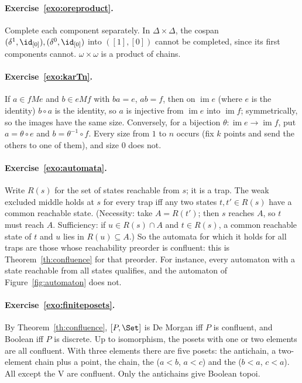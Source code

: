 \paragraph{Exercise~\ref{exo:oreproduct}.} Complete each component separately. In $\Delta\times\Delta$, the cospan $(\delta^1,\id_{[0]}), (\delta^0,\id_{[0]})$ into $([1],[0])$ cannot be completed, since its first components cannot. $\omega\times\omega$ is a product of chains.

\paragraph{Exercise~\ref{exo:karTn}.} If $a\in fMe$ and $b\in eMf$ with $ba = e$, $ab = f$, then on $\operatorname{im}e$ (where $e$ is the identity) $b\circ a$ is the identity, so $a$ is injective from $\operatorname{im}e$ into $\operatorname{im}f$; symmetrically, so the images have the same size. Conversely, for a bijection $\theta : \operatorname{im}e\to\operatorname{im}f$, put $a = \theta\circ e$ and $b = \theta^{-1}\circ f$. Every size from $1$ to $n$ occurs (fix $k$ points and send the others to one of them), and size $0$ does not.

\paragraph{Exercise~\ref{exo:automata}.} Write $R(s)$ for the set of states reachable from $s$; it is a trap. The weak excluded middle holds at $s$ for every trap iff any two states $t,t'\in R(s)$ have a common reachable state. (Necessity: take $A = R(t')$; then $s$ reaches $A$, so $t$ must reach $A$. Sufficiency: if $u\in R(s)\cap A$ and $t\in R(s)$, a common reachable state of $t$ and $u$ lies in $R(u)\subseteq A$.) So the automata for which it holds for all traps are those whose reachability preorder is confluent: this is Theorem~\ref{th:confluence} for that preorder. For instance, every automaton with a state reachable from all states qualifies, and the automaton of Figure~\ref{fig:automaton} does not.

\paragraph{Exercise~\ref{exo:finiteposets}.} By Theorem~\ref{th:confluence}, $[P,\Set]$ is De Morgan iff $P$ is confluent, and Boolean iff $P$ is discrete. Up to isomorphism, the posets with one or two elements are all confluent. With three elements there are five posets: the antichain, a two-element chain plus a point, the chain, the  ($a<b$, $a<c$) and the \q{$\Lambda$} ($b<a$, $c<a$). All except the V are confluent. Only the antichains give Boolean topoi.

